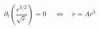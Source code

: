 \begin{equation}
\partial_t
\left(\frac{r^{3/2}}{\sqrt{\ddot{r}}}\right)=0 \ \quad
\Leftrightarrow  \quad
\ddot{r}= A
r^3 \label{diffeqS3brane}
\end{equation}

